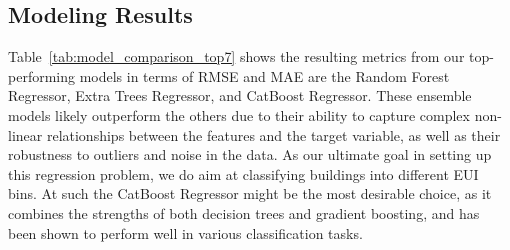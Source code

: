 \documentclass[preprint,12pt]{elsarticle}
\begin{document}
    \subsection{Modeling Results}%
    Table~\ref{tab:model_comparison_top7} shows the resulting metrics from our top-performing models in terms of RMSE and MAE are the Random Forest Regressor, Extra Trees Regressor, and CatBoost Regressor. These ensemble models likely outperform the others due to their ability to capture complex non-linear relationships between the features and the target variable, as well as their robustness to outliers and noise in the data. As our ultimate goal in setting up this regression problem, we do aim at classifying buildings into different EUI bins. At such the CatBoost Regressor might be the most desirable choice, as it combines the strengths of both decision trees and gradient boosting, and has been shown to perform well in various classification tasks. 

    \begin{table}[h!]
    \centering
    \caption{Alternative model comparison (top 7) from AutoML Pipeline}
    \label{tab:model_comparison_top7}
    \end{table}
\end{document}
